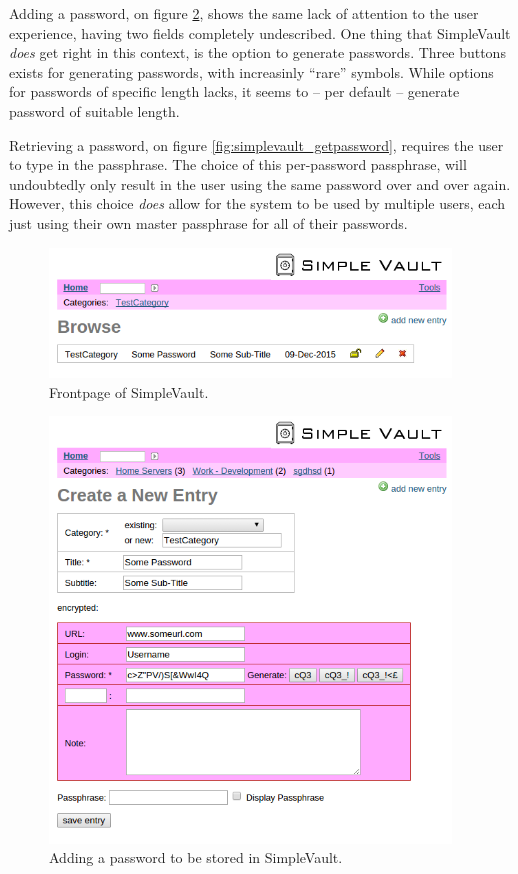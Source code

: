			Adding a password, on figure \ref{fig:simplevault_addpassword}, shows the same lack of attention to the user experience, having two fields completely undescribed. One thing that SimpleVault \emph{does} get right in this context, is the option to generate passwords. Three buttons exists for generating passwords, with increasinly ``rare'' symbols. While options for passwords of specific length lacks, it seems to -- per default -- generate password of suitable length. 

			Retrieving a password, on figure \ref{fig:simplevault_getpassword}, requires the user to type in the passphrase. The choice of this per-password passphrase, will undoubtedly only result in the user using the same password over and over again. However, this choice \emph{does} allow for the system to be used by multiple users, each just using their own master passphrase for all of their passwords.

			\begin{figure}[htbp]
				\centering
				\includegraphics[width=0.95\textwidth]{figures/analysis/simplevault_main.png}
				\caption{Frontpage of SimpleVault.}
				\label{fig:simplevault_main}
			\end{figure}

			\begin{figure}[htbp]
				\centering
				\includegraphics[width=0.95\textwidth]{figures/analysis/simplevault_newpassword.png}
				\caption{Adding a password to be stored in SimpleVault.}
				\label{fig:simplevault_addpassword}
			\end{figure}

